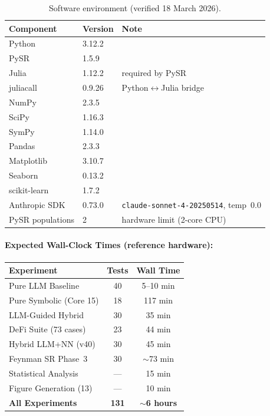 \documentclass[11pt,a4paper]{article}
\begin{document}
\begin{table}[H]
\centering
\caption{Software environment (verified 18 March 2026).}
\label{tab:runtime_reproducibility}
\small
\begin{tabular}{@{}lll@{}}
\toprule
\textbf{Component} & \textbf{Version} & \textbf{Note} \\
\midrule
Python       & 3.12.2  & \\
PySR         & 1.5.9   & \\
Julia        & 1.12.2  & required by PySR \\
juliacall    & 0.9.26  & Python$\leftrightarrow$Julia bridge \\
NumPy        & 2.3.5   & \\
SciPy        & 1.16.3  & \\
SymPy        & 1.14.0  & \\
Pandas       & 2.3.3   & \\
Matplotlib   & 3.10.7  & \\
Seaborn      & 0.13.2  & \\
scikit-learn & 1.7.2   & \\
Anthropic SDK & 0.73.0 & \texttt{claude-sonnet-4-20250514}, temp~0.0 \\
\midrule
PySR populations & 2 & hardware limit (2-core CPU) \\
\bottomrule
\end{tabular}
\end{table}

\paragraph{Expected Wall-Clock Times (reference hardware):}
\begin{small}
\begin{tabular}{@{}lcc@{}}
\toprule
\textbf{Experiment} & \textbf{Tests} & \textbf{Wall Time} \\
\midrule
Pure LLM Baseline          & 40  & 5--10 min \\
Pure Symbolic (Core 15)    & 18  & 117 min \\
LLM-Guided Hybrid          & 30  & 35 min \\
DeFi Suite (73 cases)      & 23  & 44 min \\
Hybrid LLM+NN (v40)        & 30  & 45 min \\
Feynman SR Phase~3         & 30  & $\sim$73 min \\
Statistical Analysis       & --- & 15 min \\
Figure Generation (13)     & --- & 10 min \\
\midrule
\textbf{All Experiments}   & \textbf{131} & \textbf{$\sim$6 hours} \\
\bottomrule
\end{tabular}
\end{small}
\end{document}
